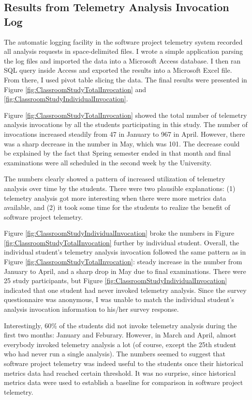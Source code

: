 \subsection{Results from Telemetry Analysis Invocation Log}
\label{EvaluationInClassroom:Results:InvocationLog}

The automatic logging facility in the software project telemetry system recorded all analysis requests in space-delimited files. I wrote a simple application parsing the log files and imported the data into a Microsoft Access database. I then ran SQL query inside Access and exported the results into a Microsoft Excel file. From there, I used pivot table slicing the data. The final results were presented in Figure \ref{fig:ClassroomStudyTotalInvocation} and \ref{fig:ClassroomStudyIndividualInvocation}.

Figure \ref{fig:ClassroomStudyTotalInvocation} showed the total number of telemetry analysis invocations by all the students participating in this study. The number of invocations increased steadily from 47 in January to 967 in April. However, there was a sharp decrease in the number in May, which was 101. The decrease could be explained by the fact that Spring semester ended in that month and final examinations were all scheduled in the second week by the University. 

The numbers clearly showed a pattern of increased utilization of telemetry analysis over time by the students. There were two plausible explanations: (1) telemetry analysis got more interesting when there were more metrics data available, and (2) it took some time for the students to realize the benefit of software project telemetry.

Figure \ref{fig:ClassroomStudyIndividualInvocation} broke the numbers in Figure \ref{fig:ClassroomStudyTotalInvocation} further by individual student. Overall, the individual student's telemetry analysis invocation followed the same pattern as in Figure \ref{fig:ClassroomStudyTotalInvocation}: steady increase in the number from January to April, and a sharp drop in May due to final examinations.  There were 25 study participants, but Figure \ref{fig:ClassroomStudyIndividualInvocation} indicated that one student had never invoked telemetry analysis. Since the survey questionnaire was anonymous, I was unable to match the individual student's analysis invocation information to his/her survey response.

Interestingly, 60\% of the students did not invoke telemetry analysis during the first two months: January and Feburary. However, in March and April, almost everybody invoked telemetry analysis a lot (of course, except the 25th student who had never run a single analysis). The numbers seemed to suggest that software project telemetry was indeed useful to the students once their historical metrics data had reached certain threshold. It was no surprise, since historical metrics data were used to establish a baseline for comparison in software project telemetry.


